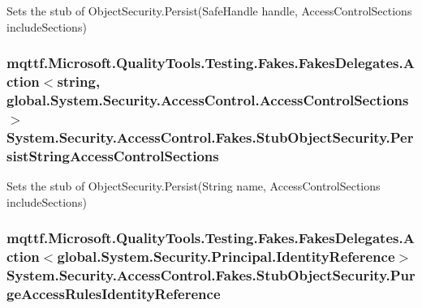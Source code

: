 Sets the stub of Object\-Security.\-Persist(\-Safe\-Handle handle, Access\-Control\-Sections include\-Sections)

\hypertarget{class_system_1_1_security_1_1_access_control_1_1_fakes_1_1_stub_object_security_a43b93709ab2c7aac6384523ab7a9bd36}{
\subsubsection[{Persist\-String\-Access\-Control\-Sections}]{\setlength{\rightskip}{0pt plus 5cm}mqttf.\-Microsoft.\-Quality\-Tools.\-Testing.\-Fakes.\-Fakes\-Delegates.\-Action$<$string, global.\-System.\-Security.\-Access\-Control.\-Access\-Control\-Sections$>$ System.\-Security.\-Access\-Control.\-Fakes.\-Stub\-Object\-Security.\-Persist\-String\-Access\-Control\-Sections}}\label{class_system_1_1_security_1_1_access_control_1_1_fakes_1_1_stub_object_security_a43b93709ab2c7aac6384523ab7a9bd36}


Sets the stub of Object\-Security.\-Persist(\-String name, Access\-Control\-Sections include\-Sections)

\hypertarget{class_system_1_1_security_1_1_access_control_1_1_fakes_1_1_stub_object_security_a309680f8c5f5f6532b3e854e9a1846b4}{
\subsubsection[{Purge\-Access\-Rules\-Identity\-Reference}]{\setlength{\rightskip}{0pt plus 5cm}mqttf.\-Microsoft.\-Quality\-Tools.\-Testing.\-Fakes.\-Fakes\-Delegates.\-Action$<$global.\-System.\-Security.\-Principal.\-Identity\-Reference$>$ System.\-Security.\-Access\-Control.\-Fakes.\-Stub\-Object\-Security.\-Purge\-Access\-Rules\-Identity\-Reference}}\label{class_system_1_1_security_1_1_access_control_1_1_fakes_1_1_stub_object_security_a309680f8c5f5f6532b3e854e9a1846b4}


